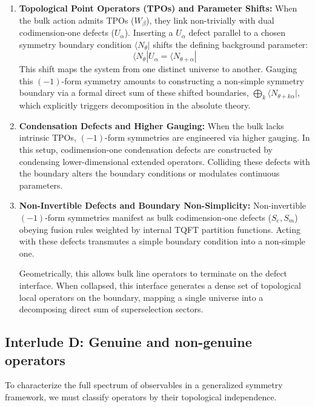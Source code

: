 \documentclass[aps,preprint,nofootinbib,preprintnumbers,eqsecnum,superscriptaddress]{revtex4}
\numberwithin{equation}{section}
\begin{document}
\begin{enumerate}[\itshape i)]
    \item {\bf Topological Point Operators (TPOs) and Parameter Shifts:} When the bulk action admits TPOs ($W_\beta$), they link non-trivially with dual codimension-one defects ($U_\alpha$). Inserting a $U_\alpha$ defect parallel to a chosen symmetry boundary condition $\langle N_\theta|$ shifts the defining background parameter:
    \begin{equation}
        \langle N_\theta| U_\alpha = \langle N_{\theta+\alpha}|
    \end{equation}
    This shift maps the system from one distinct universe to another. Gauging this $(-1)$-form symmetry amounts to constructing a non-simple symmetry boundary via a formal direct sum of these shifted boundaries, $\bigoplus_k \langle N_{\theta + k\alpha}|$, which explicitly triggers decomposition in the absolute theory.

    \item {\bf Condensation Defects and Higher Gauging:} When the bulk lacks intrinsic TPOs, $(-1)$-form symmetries are engineered via higher gauging. In this setup, codimension-one condensation defects are constructed by condensing lower-dimensional extended operators. Colliding these defects with the boundary alters the boundary conditions or modulates continuous parameters.

    \item {\bf Non-Invertible Defects and Boundary Non-Simplicity:} Non-invertible $(-1)$-form symmetries manifest as bulk codimension-one defects ($S_e, S_m$) obeying fusion rules weighted by internal TQFT partition functions. Acting with these defects transmutes a simple boundary condition into a non-simple one.
    
    Geometrically, this allows bulk line operators to terminate on the defect interface. When collapsed, this interface generates a dense set of topological local operators on the boundary, mapping a single universe into a decomposing direct sum of superselection sectors.
\end{enumerate}

\subsection{Interlude D: Genuine and non-genuine operators}
\label{sec:genuine_op}

To characterize the full spectrum of observables in a generalized symmetry framework, we must classify operators by their topological independence. 
\end{document}
